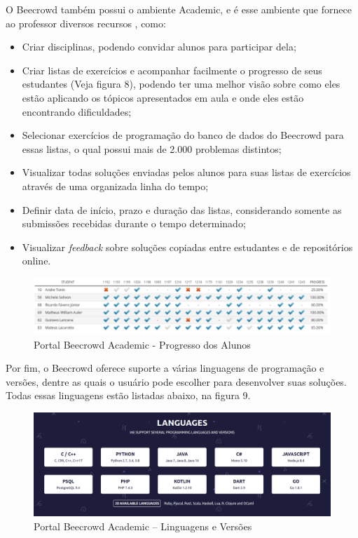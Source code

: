 O Beecrowd também possui o ambiente Academic, e é esse ambiente que fornece ao professor diversos recursos \cite{beecrowdacademic}, como:

\begin{itemize}
    \item Criar disciplinas, podendo convidar alunos para participar dela;
    \item Criar listas de exercícios e acompanhar facilmente o progresso de seus estudantes (Veja figura 8), podendo ter uma melhor visão sobre como eles estão aplicando os tópicos apresentados em aula e onde eles estão encontrando dificuldades;
    \item Selecionar exercícios de programação do banco de dados do Beecrowd para essas listas, o qual possui mais de 2.000 problemas distintos;
    \item Visualizar todas soluções enviadas pelos alunos para suas listas de exercícios através de uma organizada linha do tempo;
    \item Definir data de início, prazo e duração das listas, considerando somente as submissões recebidas durante o tempo determinado;
    \item Visualizar \textit{feedback} sobre soluções copiadas entre estudantes e de repositórios online.
\end{itemize}

\begin{figure}[h!]
	   \centering
            \caption{Portal Beecrowd Academic - Progresso dos Alunos}
            \label{fig:ModeloConceitual}
	   	\includegraphics[scale=0.3]{pictures/beecrowd_academic_progresso.png}
\end{figure}

Por fim, o Beecrowd oferece suporte a várias linguagens de programação e versões, dentre as quais o usuário pode escolher para desenvolver suas soluções. Todas essas linguagens estão listadas abaixo, na figura 9.

\begin{figure}[h!]
	   \centering
            \caption{Portal Beecrowd Academic – Linguagens e Versões}
            \label{fig:ModeloConceitual}
	   	\includegraphics[scale=0.3]{pictures/beecrowd_academic_linguagens.png}
\end{figure}

